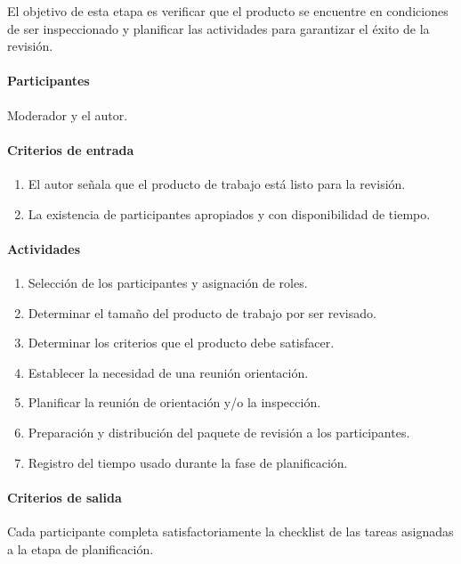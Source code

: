 El objetivo de esta etapa es verificar que el producto se encuentre en condiciones de ser inspeccionado y planificar las actividades para garantizar el éxito de la revisión.

\paragraph{Participantes\\}

Moderador y el autor.

\paragraph{Criterios de entrada}

\begin{enumerate}
	\item 
		El autor señala que el producto de trabajo está listo para la revisión.
	\item
		La existencia de participantes apropiados y con disponibilidad de tiempo.
\end{enumerate}

\paragraph{Actividades}
\begin{enumerate}
	\item 
		Selección de los participantes y asignación de roles.
	\item
		Determinar el tamaño del producto de trabajo por ser revisado.
	\item
		Determinar los criterios que el producto debe satisfacer.
	\item
		Establecer la necesidad de una reunión orientación.
	\item
		Planificar la reunión de orientación y/o la inspección.
	\item
		Preparación y distribución del paquete de revisión a los participantes.
	\item
		Registro del tiempo usado durante la fase de planificación.
\end{enumerate}

\paragraph{Criterios de salida\\}

Cada participante completa satisfactoriamente la checklist de las tareas asignadas a la etapa de planificación. 

